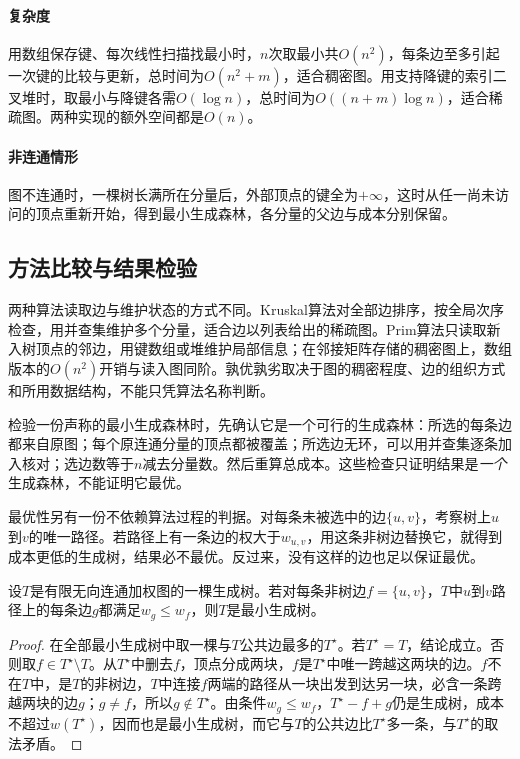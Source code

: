 \paragraph{复杂度}
用数组保存键、每次线性扫描找最小时，$n$次取最小共$O(n^2)$，每条边至多引起一次键的比较与更新，总时间为$O(n^2+m)$，适合稠密图。用支持降键的索引二叉堆时，取最小与降键各需$O(\log n)$，总时间为$O((n+m)\log n)$，适合稀疏图。两种实现的额外空间都是$O(n)$。

\paragraph{非连通情形}
图不连通时，一棵树长满所在分量后，外部顶点的键全为$+\infty$，这时从任一尚未访问的顶点重新开始，得到最小生成森林，各分量的父边与成本分别保留。

\subsection{方法比较与结果检验}
\label{sec:graph-opt-mst-comparison}

两种算法读取边与维护状态的方式不同。Kruskal算法对全部边排序，按全局次序检查，用并查集维护多个分量，适合边以列表给出的稀疏图。Prim算法只读取新入树顶点的邻边，用键数组或堆维护局部信息；在邻接矩阵存储的稠密图上，数组版本的$O(n^2)$开销与读入图同阶。孰优孰劣取决于图的稠密程度、边的组织方式和所用数据结构，不能只凭算法名称判断。

检验一份声称的最小生成森林时，先确认它是一个可行的生成森林：所选的每条边都来自原图；每个原连通分量的顶点都被覆盖；所选边无环，可以用并查集逐条加入核对；选边数等于$n$减去分量数。然后重算总成本。这些检查只证明结果是\emph{一个}生成森林，不能证明它最优。

最优性另有一份不依赖算法过程的判据。对每条未被选中的边$\{u,v\}$，考察树上$u$到$v$的唯一路径。若路径上有一条边的权大于$w_{u,v}$，用这条非树边替换它，就得到成本更低的生成树，结果必不最优。反过来，没有这样的边也足以保证最优。

\begin{theorem}[非树边条件]
\label{thm:graph-opt-mst-cycle-certificate}
设$T$是有限无向连通加权图的一棵生成树。若对每条非树边$f=\{u,v\}$，$T$中$u$到$v$路径上的每条边$g$都满足$w_g\leq w_f$，则$T$是最小生成树。
\end{theorem}

\begin{proof}
在全部最小生成树中取一棵与$T$公共边最多的$T^\star$。若$T^\star=T$，结论成立。否则取$f\in T^\star\setminus T$。从$T^\star$中删去$f$，顶点分成两块，$f$是$T^\star$中唯一跨越这两块的边。$f$不在$T$中，是$T$的非树边，$T$中连接$f$两端的路径从一块出发到达另一块，必含一条跨越两块的边$g$；$g\neq f$，所以$g\notin T^\star$。由条件$w_g\leq w_f$，$T^\star-f+g$仍是生成树，成本不超过$w(T^\star)$，因而也是最小生成树，而它与$T$的公共边比$T^\star$多一条，与$T^\star$的取法矛盾。
\end{proof}

